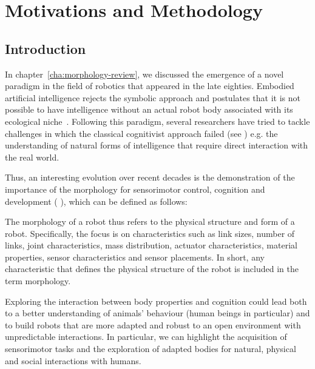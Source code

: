 
\chapter{Motivations and Methodology}
\label{cha:methodology}

\section{Introduction} %

In chapter~\ref{cha:morphology-review}, we discussed the emergence of a novel paradigm in the field of robotics that appeared in the late eighties.  Embodied artificial intelligence rejects the symbolic approach and postulates that it is not possible to have intelligence without an actual robot body associated with its ecological niche~\parencite{pfeifer2001understanding}. Following this paradigm, several researchers have tried to tackle challenges in which the classical cognitivist approach failed (see \parencite{brooks1986achieving}) e.g. the understanding of natural forms of intelligence that require direct interaction with the real world.

Thus, an interesting evolution over recent decades is the demonstration of the importance of the morphology for sensorimotor control, cognition and development (\parencite{kaplan2008corps} \parencite{steels1995artificial} \parencite{Pfeifer06}), which can be defined as follows:
\begin{formal}
    The morphology of a robot thus refers to the physical structure and form of a robot. Specifically, the focus is on characteristics such as link sizes, number of links, joint characteristics, mass distribution, actuator characteristics, material properties, sensor characteristics and sensor placements. In short, any characteristic that defines the physical structure of the robot is included in the term morphology.
\end{formal}

Exploring the interaction between body properties and cognition could lead both to a better understanding of animals’ behaviour (human beings in particular) and to build robots that are more adapted and robust to an open environment with unpredictable interactions. In particular, we can highlight the acquisition of sensorimotor tasks and the exploration of adapted bodies for natural, physical and social interactions with humans.

